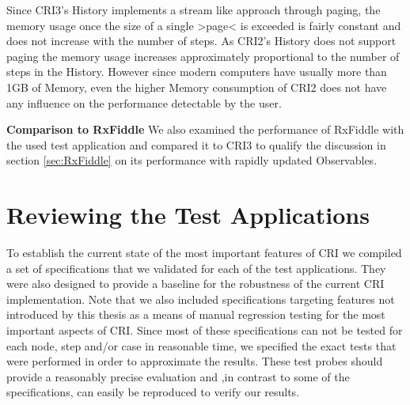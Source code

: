 	Since CRI3's History implements a stream like approach through paging, the memory usage once the size of a single >page< is exceeded is fairly constant and does not increase with the number of steps. As CRI2's History does not support paging the memory usage increases approximately proportional to the number of steps in the History. However since modern computers have usually more than 1GB of Memory, even the higher Memory consumption of CRI2 does not have any influence on the performance detectable by the user.

	
	\textbf{Comparison to RxFiddle}
	We also examined the performance of RxFiddle with the used test application and compared it to CRI3 to qualify the discussion in section \ref{sec:RxFiddle} on its performance with rapidly updated Observables.
	
\section{Reviewing the Test Applications}
\label{sec:EvalTests}
To establish the current state of the most important features of CRI we compiled a set of specifications that we validated for each of the test applications. They were also designed to provide a baseline for the robustness of the current CRI implementation. Note that we also included specifications targeting features not introduced by this thesis as a means of manual regression testing for the most important aspects of CRI. Since most of these specifications can not be tested for each node, step and/or case in reasonable time, we specified the exact tests that were performed in order to approximate the results. These test probes should provide a reasonably precise evaluation and ,in contrast to some of the specifications, can easily be reproduced to verify our results.


